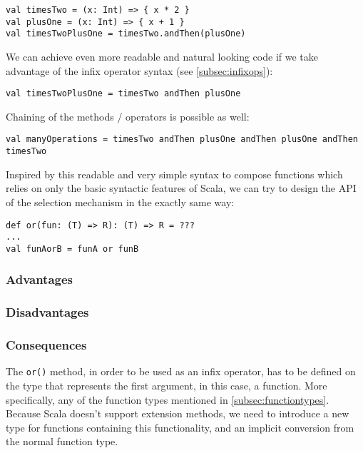 \lstset{style=Scala}
\begin{lstlisting}
val timesTwo = (x: Int) => { x * 2 }
val plusOne = (x: Int) => { x + 1 }
val timesTwoPlusOne = timesTwo.andThen(plusOne)
\end{lstlisting}

We can achieve even more readable and natural looking code if we take advantage of the infix operator syntax (see \ref{subsec:infixops}):

\lstset{style=Scala}
\begin{lstlisting}
val timesTwoPlusOne = timesTwo andThen plusOne
\end{lstlisting}

Chaining of the methods / operators is possible as well:

\lstset{style=Scala}
\begin{lstlisting}
val manyOperations = timesTwo andThen plusOne andThen plusOne andThen timesTwo
\end{lstlisting}

Inspired by this readable and very simple syntax to compose functions which relies on only the basic syntactic features of Scala, we can try to design the API of the selection mechanism in the exactly same way:

\lstset{style=Scala}
\begin{lstlisting}
def or(fun: (T) => R): (T) => R = ???
...
val funAorB = funA or funB
\end{lstlisting}

\subsubsection{Advantages}
\subsubsection{Disadvantages}
\subsubsection{Consequences}

The \lstinline|or()| method, in order to be used as an infix operator, has to be defined on the type that represents the first argument, in this case, a function. More specifically, any of the function types mentioned in \ref{subsec:functiontypes}. Because Scala doesn't support extension methods, we need to introduce a new type for functions containing this functionality, and an implicit conversion from the normal function type.


